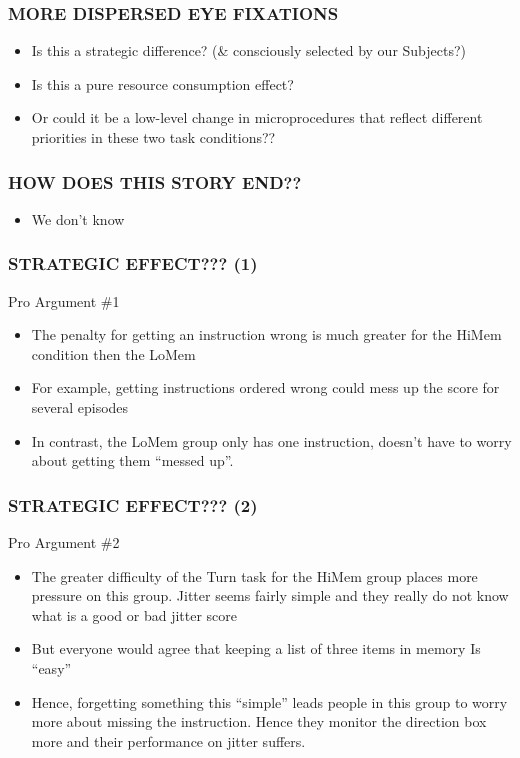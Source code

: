 \documentclass{beamer}
\begin{document}
\begin{frame} 
	\frametitle{MORE DISPERSED EYE FIXATIONS}
	\begin{itemize}
		\item Is this a strategic difference? (\& consciously selected by our Subjects?)
		\pause
		\item Is this a pure resource consumption effect?
		\pause
		\item Or could it be a low-level change in microprocedures that reflect different priorities in these two task conditions??
 	\end{itemize}
\end{frame}

\begin{frame} 
	\frametitle{HOW DOES THIS STORY END??}
	\begin{itemize}
		\item We don't know
 	\end{itemize}
\end{frame}

\begin{frame} 
	\frametitle{STRATEGIC EFFECT??? (1)}
	Pro Argument \#1
	\begin{itemize}
		\item The penalty for getting an instruction wrong is much greater for the HiMem condition then the LoMem
		\item For example, getting instructions ordered wrong could mess up the score for several episodes
		\item In contrast, the LoMem group only has one instruction, doesn't have to worry about getting them ``messed up''. 
 	\end{itemize}
\end{frame}

\begin{frame} 
	\frametitle{STRATEGIC EFFECT??? (2)}
	Pro Argument \#2
		\begin{itemize}
		\item The greater difficulty of the Turn task for the HiMem group places more pressure on this group. Jitter seems fairly simple and they really do not know what is a good or bad jitter score
		\item But everyone would agree that keeping a list of three items in memory Is ``easy''
		\item Hence, forgetting something this ``simple'' leads people in this group to worry more about missing the instruction. Hence they monitor the direction box more and their performance on jitter suffers.
	\end{itemize}
\end{frame}
\end{document}
